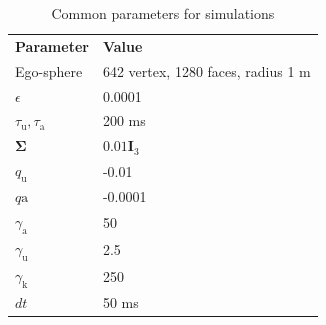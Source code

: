 \documentclass[letterpaper, 10 pt, conference]{ieeeconf}  %
\begin{document}
	\begin{table}[h!]
		\caption{Common parameters for simulations}
		\label{tab:params}
		\begin{center}
			\begin{tabular}{p{3.2cm} p{4.2cm}}
				\cellcolor{darkcyan!20}\textbf{Parameter} & \cellcolor{darkcyan!20}\textbf{Value} \\
				Ego-sphere & 642 vertex, 1280 faces, radius 1 m\\
				\cellcolor{gray!8}$\epsilon$ & \cellcolor{gray!8}0.0001\\
				$\tau_{\mathrm{u}}, \tau_{\mathrm{a}}$ & 200 ms\\
				\cellcolor{gray!8}$\mathbf{\Sigma}$ & \cellcolor{gray!8}$0.01\mathbf{I}_3$ \\
				$q_\mathrm{u}$ & -0.01 \\
				\cellcolor{gray!8}$q\mathrm{a}$ & \cellcolor{gray!8}-0.0001 \\
				$\gamma_{\mathrm{a}}$ & 50\\
				\cellcolor{gray!8}$\gamma_\mathrm{u}$ & \cellcolor{gray!8}2.5\\
				$\gamma_\mathrm{k}$ & 250\\
				\cellcolor{gray!8}$dt$ & \cellcolor{gray!8}50 ms\\
			\end{tabular}
		\end{center}
	\end{table}
	
\end{document}
